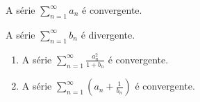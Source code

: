 \documentclass[11pt, a4paper]{article}
\begin{document}

\begin{proposition}\label{prop:af1-ex8-an-convergente}
	A série $\sum_{n=1}^{\infty} a_n$ é convergente.
\end{proposition}

\begin{proposition}\label{prop:af1-ex8-bn-divergente}
	A série $\sum_{n=1}^{\infty} b_n$ é divergente.
\end{proposition}


\begin{enumerate}[label=\arabic{section}.\arabic*.]
	\item
	      \begin{proposition}
		      A série $\sum_{n=1}^{\infty} \frac{a_n^2}{1 + b_n}$ é convergente.
	      \end{proposition}
	\item
	      \begin{proposition}
		      A série $\sum_{n=1}^{\infty} \left(a_n + \frac{1}{b_n}\right)$ é convergente.
	      \end{proposition}
\end{enumerate}

\end{document}
